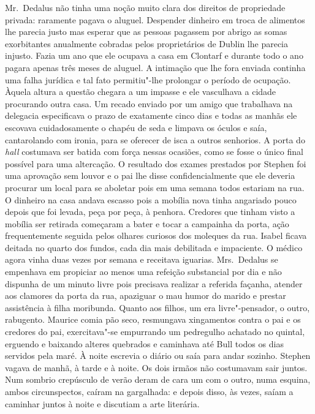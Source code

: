 Mr.~Dedalus não tinha uma noção muito clara dos direitos de propriedade
privada: raramente pagava o aluguel.  Despender dinheiro em troca de alimentos
lhe parecia justo mas esperar que as pessoas pagassem por abrigo as somas
exorbitantes anualmente cobradas pelos proprietários de Dublin lhe parecia
injusto.  Fazia um ano que ele ocupava a casa em Clontarf e durante todo o ano
pagara apenas três meses de aluguel.  A intimação que lhe fora enviada
\label{continha"-uma} continha uma falha jurídica e tal fato permitiu"-lhe prolongar o período de
ocupação.  Àquela altura a questão chegara a um impasse e ele vasculhava a
cidade procurando outra casa.  Um recado enviado por um amigo que trabalhava na
delegacia especificava o prazo de exatamente cinco dias e todas as manhãs ele
escovava cuidadosamente o chapéu de seda e limpava os óculos e saía,
cantarolando com ironia, para se oferecer de isca a outros senhorios.  A porta
do \textit{hall} costumava ser batida com força nessas ocasiões, como se fosse
o único final possível para uma altercação.  O resultado dos exames prestados
por Stephen foi uma aprovação sem louvor e o pai lhe disse confidencialmente
que ele deveria procurar um local para se aboletar pois em uma semana todos
estariam na rua.  O dinheiro na casa andava escasso pois a mobília nova tinha
angariado pouco depois que foi levada, peça por peça, à penhora.  Credores que
tinham visto a mobília ser retirada começaram a bater e tocar a campainha da
porta, ação frequentemente seguida pelos olhares curiosos dos moleques da rua.
Isabel ficava deitada no quarto dos fundos, cada dia mais debilitada e
impaciente.  O médico agora vinha duas vezes por semana e receitava iguarias.
Mrs.~Dedalus se empenhava em propiciar ao menos uma refeição substancial por
dia e não dispunha de um minuto livre pois precisava realizar a referida
façanha, atender aos clamores da porta da rua, apaziguar o mau humor do marido
e prestar assistência à filha moribunda.  Quanto aos filhos, um era
livre"-pensador, o outro, rabugento.  \label{maurice"-comia} Maurice comia pão seco, resmungava
xingamentos contra o pai e os credores do pai, exercitava"-se empurrando um
pedregulho achatado no quintal, erguendo e baixando alteres quebrados e
caminhava até Bull todos os dias servidos pela maré.  À noite escrevia o diário		
ou saía para andar sozinho.  Stephen vagava de manhã, à tarde e à noite.  Os
dois irmãos não costumavam sair juntos.  Num
sombrio crepúsculo de verão deram de cara um com o outro, numa
esquina, ambos circunspectos, caíram na gargalhada: e depois disso, às vezes,
saíam a caminhar juntos à noite e discutiam a arte literária.  

